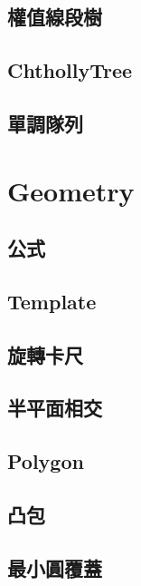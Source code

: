     \subsection{權值線段樹}
         \columnbreak
    \subsection{ChthollyTree}
         
    \subsection{單調隊列}
        
\clearpage
        
\section{Geometry}
    \subsection{公式}
        
    \subsection{Template}
        
    \subsection{旋轉卡尺}
        
    \subsection{半平面相交}
        
    \subsection{Polygon}
         \columnbreak
        \subsection{凸包}
        
        \subsection{最小圓覆蓋}
        
